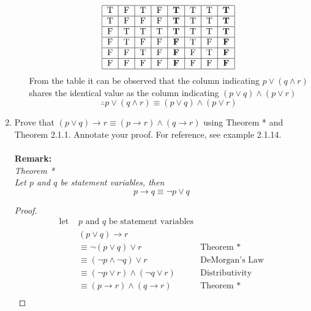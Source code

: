 \documentclass[12pt]{article}
\begin{document}
\begin{enumerate}
\begin{enumerate}[(a)]
\[\begin{tabular}{|c|c|c|c|c|c|c|c|}
                    \hline
                    T&F&T&F&\textbf{T}&T&T&\textbf{T}\\
                    \hline
                    T&F&F&F&\textbf{T}&T&T&\textbf{T}\\
                    \hline
                    F&T&T&T&\textbf{T}&T&T&\textbf{T}\\
                    \hline
                    F&T&F&F&\textbf{F}&T&F&\textbf{F}\\
                    \hline
                    F&F&T&F&\textbf{F}&F&T&\textbf{F}\\
                    \hline
                    F&F&F&F&\textbf{F}&F&F&\textbf{F}\\
                    \hline
                    \end{tabular}
                \]
                From the table it can be observed that the column indicating $p \vee (q \wedge r)$ shares the identical value as the column indicating $(p \vee q) \wedge (p \vee r)$
                \[
                \therefore p \vee (q \wedge r) \equiv (p \vee q) \wedge (p \vee r)
                \]
        \end{enumerate}
        \newpage
        \item Prove that $(p \vee q) \rightarrow r \equiv (p \rightarrow r) \wedge (q \rightarrow r)$ using Theorem * and Theorem 2.1.1. Annotate your proof. For reference, see example 2.1.14.\\ \\
        \textbf{Remark:}\\
            \textit{Theorem *}\\
            \textit{Let $p$ and $q$ be statement variables, then}
            \[
            p \rightarrow q \equiv \neg p \vee q
            \]
        \begin{proof}
            \begin{align*}
                \text{let } & \text{$p$ and $q$ be statement variables}\\
                &(p \vee q) \rightarrow r  \\
                & \equiv \neg (p \vee q) \vee r \;\;\; &\text{Theorem *} \\
                & \equiv (\neg p \wedge \neg q) \vee r \;\;\;  &\text{DeMorgan's Law}  \\
                & \equiv (\neg p \vee r) \wedge (\neg q \vee r) \;\;\; &\text{Distributivity} \\
                & \equiv (p \rightarrow r) \wedge (q \rightarrow r) \;\;\; &\text{Theorem *}\\

\end{align*}
\end{proof}
\end{enumerate}
\end{document}
